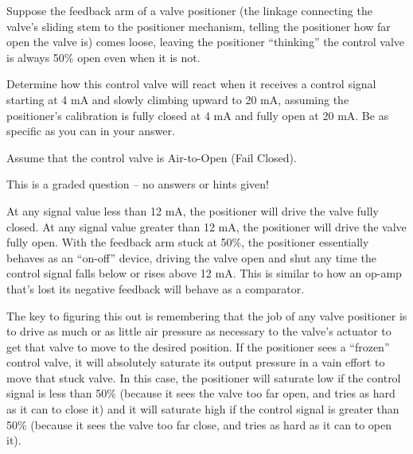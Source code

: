 

Suppose the feedback arm of a valve positioner (the linkage connecting the valve's sliding stem to the positioner mechanism, telling the positioner how far open the valve is) comes loose, leaving the positioner ``thinking'' the control valve is always 50\% open even when it is not.

\vskip 10pt

Determine how this control valve will react when it receives a control signal starting at 4 mA and slowly climbing upward to 20 mA, assuming the positioner's calibration is fully closed at 4 mA and fully open at 20 mA.  Be as specific as you can in your answer.

\vskip 10pt

Assume that the control valve is Air-to-Open (Fail Closed).

\vfil

\eject






This is a graded question -- no answers or hints given!







At any signal value less than 12 mA, the positioner will drive the valve fully closed.  At any signal value greater than 12 mA, the positioner will drive the valve fully open.  With the feedback arm stuck at 50\%, the positioner essentially behaves as an ``on-off'' device, driving the valve open and shut any time the control signal falls below or rises above 12 mA.  This is similar to how an op-amp that's lost its negative feedback will behave as a comparator.

\vskip 10pt

The key to figuring this out is remembering that the job of any valve positioner is to drive as much or as little air pressure as necessary to the valve's actuator to get that valve to move to the desired position.  If the positioner sees a ``frozen'' control valve, it will absolutely saturate its output pressure in a vain effort to move that stuck valve.  In this case, the positioner will saturate low if the control signal is less than 50\% (because it sees the valve too far open, and tries as hard as it can to close it) and it will saturate high if the control signal is greater than 50\% (because it sees the valve too far close, and tries as hard as it can to open it).






